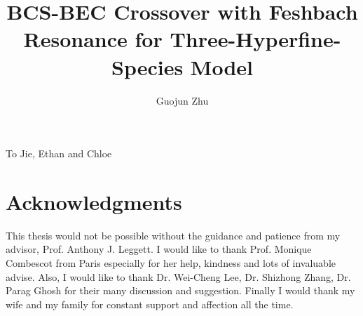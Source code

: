 \documentclass[edeposit,fullpage]{uiucthesis2009}
\begin{document}
\title{BCS-BEC Crossover with Feshbach Resonance for Three-Hyperfine-Species Model}
\author{Guojun Zhu}
\phdthesis
{}
\maketitle

\frontmatter

\begin{abstract}
\end{abstract}

\begin{dedication}
To Jie, Ethan and Chloe
\end{dedication}

\chapter*{Acknowledgments}
This thesis would not be possible without the guidance and patience from my advisor, Prof. Anthony J. Leggett.  I would like to thank Prof. Monique Combescot from Paris especially for her help, kindness and lots of invaluable advise.  Also, I would like to thank Dr. Wei-Cheng Lee, Dr. Shizhong Zhang, Dr. Parag Ghosh for their many discussion and suggestion.  Finally I would thank my wife and my family for constant support and affection all the time.  

\end{document}
